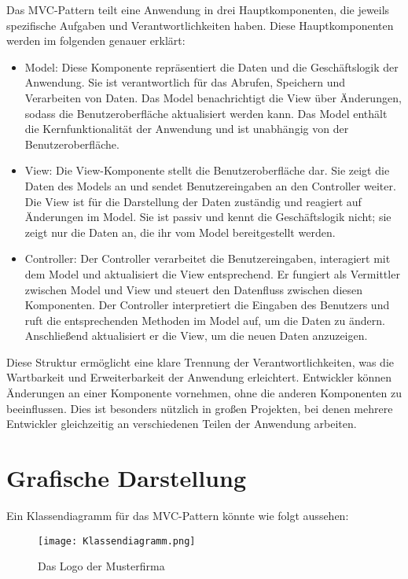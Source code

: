 Das MVC-Pattern teilt eine Anwendung in drei Hauptkomponenten, die jeweils spezifische Aufgaben und Verantwortlichkeiten haben. Diese Hauptkomponenten werden im folgenden genauer erklärt:
\begin{itemize}

\item Model: Diese Komponente repräsentiert die Daten und die Geschäftslogik der Anwendung. Sie ist verantwortlich für das Abrufen, Speichern und Verarbeiten von Daten. Das Model benachrichtigt die View über Änderungen, sodass die Benutzeroberfläche aktualisiert werden kann. Das Model enthält die Kernfunktionalität der Anwendung und ist unabhängig von der Benutzeroberfläche.

\item View: Die View-Komponente stellt die Benutzeroberfläche dar. Sie zeigt die Daten des Models an und sendet Benutzereingaben an den Controller weiter. Die View ist für die Darstellung der Daten zuständig und reagiert auf Änderungen im Model. Sie ist passiv und kennt die Geschäftslogik nicht; sie zeigt nur die Daten an, die ihr vom Model bereitgestellt werden.

\item Controller: Der Controller verarbeitet die Benutzereingaben, interagiert mit dem Model und aktualisiert die View entsprechend. Er fungiert als Vermittler zwischen Model und View und steuert den Datenfluss zwischen diesen Komponenten. Der Controller interpretiert die Eingaben des Benutzers und ruft die entsprechenden Methoden im Model auf, um die Daten zu ändern. Anschließend aktualisiert er die View, um die neuen Daten anzuzeigen.

\end{itemize}
Diese Struktur ermöglicht eine klare Trennung der Verantwortlichkeiten, was die Wartbarkeit und Erweiterbarkeit der Anwendung erleichtert. Entwickler können Änderungen an einer Komponente vornehmen, ohne die anderen Komponenten zu beeinflussen. Dies ist besonders nützlich in großen Projekten, bei denen mehrere Entwickler gleichzeitig an verschiedenen Teilen der Anwendung arbeiten.

\section{Grafische Darstellung}

Ein Klassendiagramm für das MVC-Pattern könnte wie folgt aussehen:

\begin{figure}[h]
\centering
\texttt{[image: Klassendiagramm.png]}
\caption{Das Logo der Musterfirma\footnotemark}
\end{figure}

